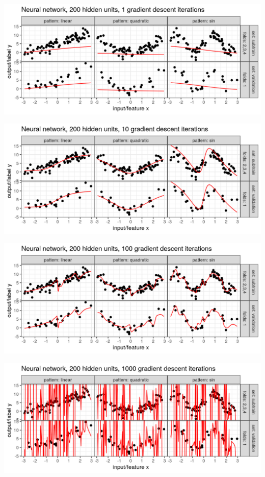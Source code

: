 
\begin{frame}
  \includegraphics[width=\textwidth]{figure-overfitting-pred-units=200-maxit=1.png}
\end{frame}


\begin{frame}
  \includegraphics[width=\textwidth]{figure-overfitting-pred-units=200-maxit=10.png}
\end{frame}


\begin{frame}
  \includegraphics[width=\textwidth]{figure-overfitting-pred-units=200-maxit=100.png}
\end{frame}


\begin{frame}
  \includegraphics[width=\textwidth]{figure-overfitting-pred-units=200-maxit=1000.png}
\end{frame}



